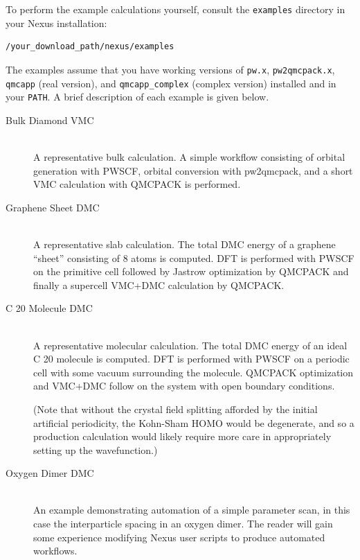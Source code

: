 \documentclass[oneside,11pt]{memoir}
\numberwithin{equation}{section}
\begin{document}
To perform the example calculations yourself, consult the \texttt{examples} 
directory in your Nexus installation:
\begin{shaded}
\begin{verbatim}
/your_download_path/nexus/examples
\end{verbatim}
\end{shaded}
\noindent
The examples assume that you have working versions of \texttt{pw.x}, 
\texttt{pw2qmcpack.x}, \texttt{qmcapp} (real version), and 
\texttt{qmcapp\_complex} (complex version) installed and in your \texttt{PATH}. 
A brief description of each example is given below.  


\begin{description}
  \item[Bulk Diamond VMC] \hfill \\
    A representative bulk calculation.  A simple workflow consisting 
    of orbital generation with PWSCF, orbital conversion with pw2qmcpack, 
    and a short VMC calculation with QMCPACK is performed.

  \item[Graphene Sheet DMC] \hfill \\
    A representative slab calculation.  The total DMC energy of a graphene 
    ``sheet'' consisting of 8 atoms is computed.  DFT is performed with 
    PWSCF on the primitive cell followed by Jastrow optimization by QMCPACK 
    and finally a supercell VMC+DMC calculation by QMCPACK.  

  \item[C 20 Molecule DMC] \hfill  \\
    A representative molecular calculation.  The total DMC energy of an ideal 
    C 20 molecule is computed.  DFT is performed with PWSCF on a periodic cell 
    with some vacuum surrounding the molecule.  QMCPACK optimization and 
    VMC+DMC follow on the system with open boundary conditions.  

    (Note that without the crystal field splitting afforded by the initial 
    artificial periodicity, the Kohn-Sham HOMO would be degenerate, and so a 
    production calculation would likely require more care in appropriately 
    setting up the wavefunction.)

  \item[Oxygen Dimer DMC] \hfill \\
    An example demonstrating automation of a simple parameter scan, in this 
    case the interparticle spacing in an oxygen dimer.  The reader will gain 
    some experience modifying Nexus user scripts to produce automated workflows.
\end{description}
\end{document}
